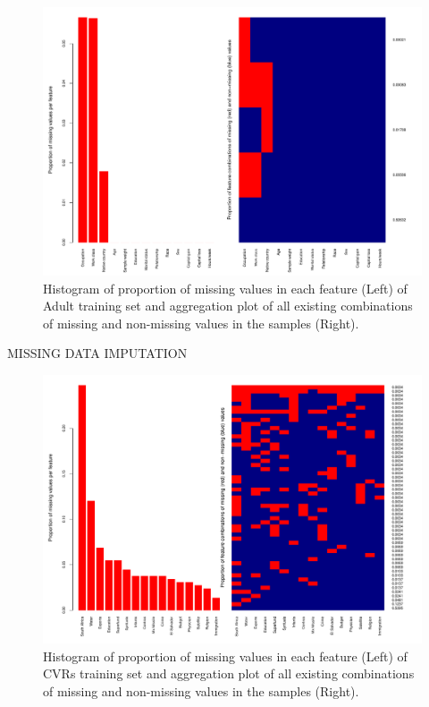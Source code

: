 \documentclass[10pt]{book}
\theoremstyle{definition}
\begin{document}
\newpage
\lhead[\footnotesize\thepage\fancyplain{}\leftmark]{}\rhead[]{\fancyplain{}\rightmark\footnotesize\thepage}%

\begin{figure}[h!]
\includegraphics [scale=0.45]{figure/proportion-missing-adult.pdf}\par
\caption{\footnotesize Histogram of proportion of missing values in each feature (Left) of Adult training set and aggregation plot of all existing combinations of missing and non-missing values in the samples (Right).}
 \label{fig:proportion-missing-adult}
\end{figure}

\clearpage
{}
{\hfill {\footnotesize\rm MISSING DATA IMPUTATION} \hfill}

\begin{figure}[h!]
\includegraphics [scale=0.45]{figure/proportion-missing-votes.pdf}\par
\caption{\footnotesize Histogram of proportion of missing values in each feature (Left) of CVRs training set and aggregation plot of all existing combinations of missing and non-missing values in the samples (Right).}
 \label{fig:proportion-missing-votes}
\end{figure}
\end{document}
